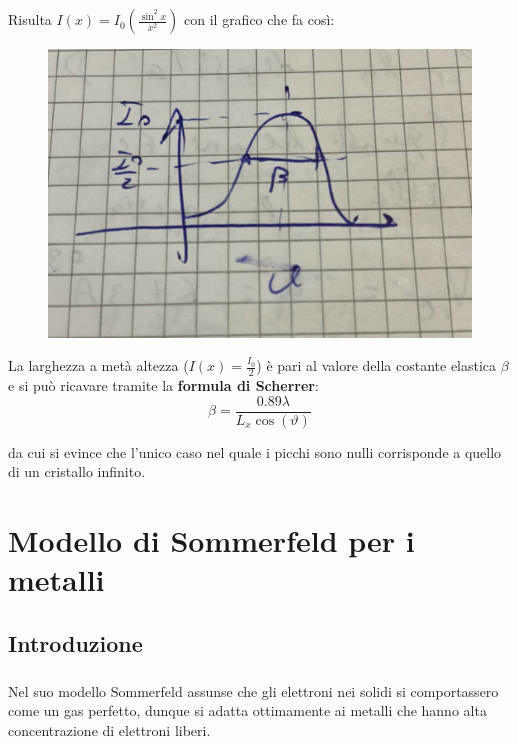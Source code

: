 \documentclass{book}
\begin{document}
            \paragraph{}
                Risulta $I(x) = I_{0}(\frac{\sin ^{2} x}{x^{2}})$ con il grafico che fa così:
                \begin{figure}[h!]
                    \centering
                    \includegraphics[width=0.5\linewidth]{img/scherrerFormulaLez9.png}
                \end{figure}
            La larghezza a metà altezza ($I(x) = \frac{I_{0}}{2}$) è pari al valore della costante elastica $\beta$ e si può ricavare tramite la \textbf{formula di Scherrer}:
            $$\beta = \frac{0.89 \lambda}{L_{x} \cos{(\vartheta)}}$$

            da cui si evince che l'unico caso nel quale i picchi sono nulli corrisponde a quello di un cristallo infinito. 

\chapter{Modello di Sommerfeld per i metalli}
    \section{Introduzione}
        \paragraph{}
            Nel suo modello Sommerfeld assunse che gli elettroni nei solidi si comportassero come un gas perfetto, dunque si adatta ottimamente ai metalli che hanno alta concentrazione di elettroni liberi.
\end{document}
